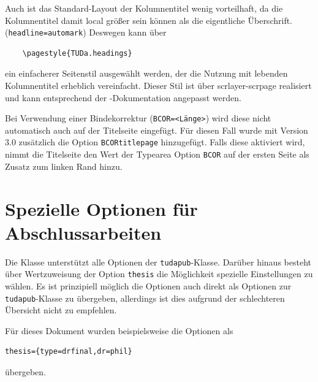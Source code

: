 \documentclass[
	ngerman,
	ruledheaders=section,%
	class=report,%
	thesis={type=bachelor},%
	accentcolor=9c,%
	custommargins=true,%
	marginpar=false,%
	parskip=half-,%
	fontsize=11pt,%
]{tudapub}
\let\file\texttt
\let\code\texttt
\let\pck\textsf
\begin{document}
Auch ist das Standard-Layout der Kolumnentitel wenig vorteilhaft, da die Kolumnentitel damit local größer sein können als die eigentliche Überschrift. (\code{headline=automark})
Deswegen kann über
\begin{verbatim}
	\pagestyle{TUDa.headings}
\end{verbatim}
ein einfacherer Seitenstil ausgewählt werden, der die Nutzung mit lebenden Kolumnentitel erheblich vereinfacht. Dieser Stil ist über \pck{scrlayer-scrpage} realisiert und kann entsprechend der \KOMAScript{}-Dokumentation angepasst werden.

Bei Verwendung einer Bindekorrektur (\code{BCOR=<Länge>}) wird diese nicht automatisch auch auf der Titelseite eingefügt. Für diesen Fall wurde mit Version 3.0 zusätzlich die Option \code{BCORtitlepage} hinzugefügt. Falls diese aktiviert wird, nimmt die Titelseite den Wert der Typearea Option \code{BCOR} auf der ersten Seite als Zusatz zum linken Rand hinzu.



\section{Spezielle Optionen für Abschlussarbeiten}
Die Klasse unterstützt alle Optionen der \file{tudapub}-Klasse. Darüber hinaus besteht über Wertzuweisung der Option \code{thesis} die Möglichkeit spezielle Einstellungen zu wählen.
Es ist prinzipiell möglich die Optionen auch direkt als Optionen zur \file{tudapub}-Klasse zu übergeben, allerdings ist dies aufgrund der schlechteren Übersicht nicht zu empfehlen.

Für dieses Dokument wurden beispielsweise die Optionen als
\begin{verbatim}
thesis={type=drfinal,dr=phil}
\end{verbatim}
übergeben.
\end{document}
